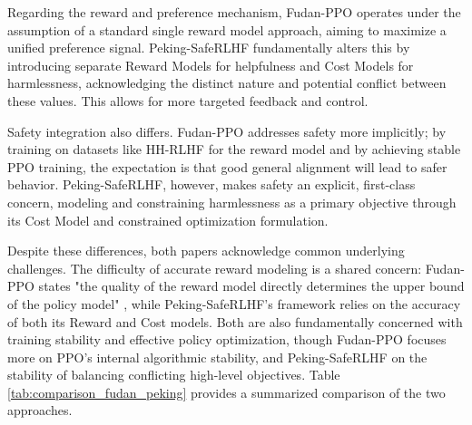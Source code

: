 \documentclass{article}
\begin{document}
Regarding the reward and preference mechanism, Fudan-PPO operates under the assumption of a standard single reward model approach, aiming to maximize a unified preference signal. Peking-SafeRLHF fundamentally alters this by introducing separate Reward Models for helpfulness and Cost Models for harmlessness, acknowledging the distinct nature and potential conflict between these values. This allows for more targeted feedback and control.

Safety integration also differs. Fudan-PPO addresses safety more implicitly; by training on datasets like HH-RLHF for the reward model \cite{Zheng2023PPO} and by achieving stable PPO training, the expectation is that good general alignment will lead to safer behavior. Peking-SafeRLHF, however, makes safety an explicit, first-class concern, modeling and constraining harmlessness as a primary objective through its Cost Model and constrained optimization formulation.

Despite these differences, both papers acknowledge common underlying challenges. The difficulty of accurate reward modeling is a shared concern: Fudan-PPO states "the quality of the reward model directly determines the upper bound of the policy model" \cite{Zheng2023PPO}, while Peking-SafeRLHF's framework relies on the accuracy of both its Reward and Cost models. Both are also fundamentally concerned with training stability and effective policy optimization, though Fudan-PPO focuses more on PPO's internal algorithmic stability, and Peking-SafeRLHF on the stability of balancing conflicting high-level objectives. Table \ref{tab:comparison_fudan_peking} provides a summarized comparison of the two approaches.
\end{document}
